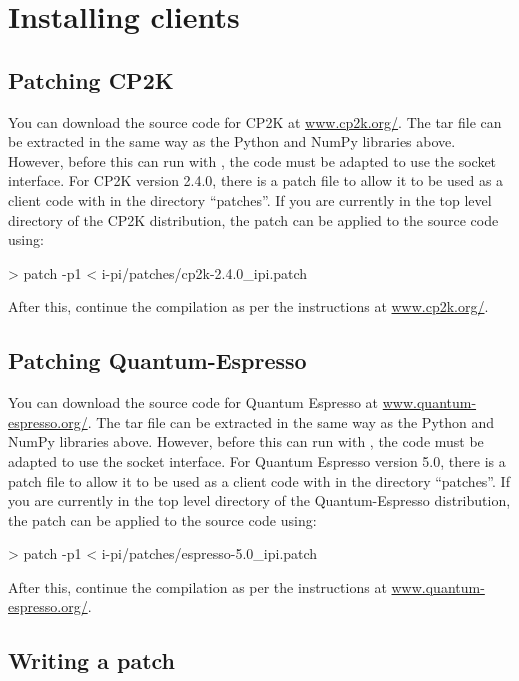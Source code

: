 \documentclass[11pt,english,fleqn]{report}
\newenvironment{code}{%
\footnotesize 
\verbatim
}{
\endverbatim
\normalsize
}
\begin{document}
\section{Installing clients}

\label{clientinstall}

\subsection{Patching CP2K}


You can download the source code for CP2K at \url{www.cp2k.org/}.
The tar file can be extracted in the same way as the Python and NumPy
libraries above. However, before this can run with \ipi, the code
must be adapted to use the socket interface. For CP2K
version 2.4.0, there is a patch file to allow it to be used as a client
code with \ipi in the directory {}``patches''. If you are
currently in the top level directory of the CP2K distribution,
the patch can be applied to the source code using:

\begin{code}
> patch -p1 < i-pi/patches/cp2k-2.4.0_ipi.patch
\end{code}

After this, continue the compilation as per the instructions at \url{www.cp2k.org/}.


\subsection{Patching Quantum-Espresso}

You can download the source code for Quantum Espresso at \url{www.quantum-espresso.org/}.
The tar file can be extracted in the same way as the Python and NumPy
libraries above. However, before this can run with \ipi, the code
must be adapted to use the socket interface. For Quantum Espresso
version 5.0, there is a patch file to allow it to be used as a client
code with \ipi in the directory {}``patches''. If you are
currently in the top level directory of the Quantum-Espresso distribution,
the patch can be applied to the source code using:

\begin{code}
> patch -p1 < i-pi/patches/espresso-5.0_ipi.patch
\end{code}

After this, continue the compilation as per the instructions at \url{www.quantum-espresso.org/}.


\subsection{Writing a patch}
\end{document}
